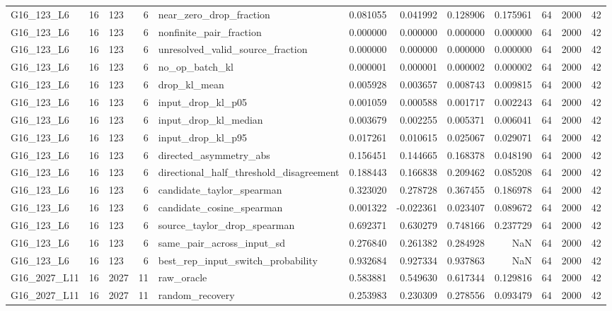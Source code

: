 \begin{tabular}{lrlrlrrrrrrr}
G16_123_L6 & 16 & 123 & 6 & near_zero_drop_fraction & 0.081055 & 0.041992 & 0.128906 & 0.175961 & 64 & 2000 & 42 \\
G16_123_L6 & 16 & 123 & 6 & nonfinite_pair_fraction & 0.000000 & 0.000000 & 0.000000 & 0.000000 & 64 & 2000 & 42 \\
G16_123_L6 & 16 & 123 & 6 & unresolved_valid_source_fraction & 0.000000 & 0.000000 & 0.000000 & 0.000000 & 64 & 2000 & 42 \\
G16_123_L6 & 16 & 123 & 6 & no_op_batch_kl & 0.000001 & 0.000001 & 0.000002 & 0.000002 & 64 & 2000 & 42 \\
G16_123_L6 & 16 & 123 & 6 & drop_kl_mean & 0.005928 & 0.003657 & 0.008743 & 0.009815 & 64 & 2000 & 42 \\
G16_123_L6 & 16 & 123 & 6 & input_drop_kl_p05 & 0.001059 & 0.000588 & 0.001717 & 0.002243 & 64 & 2000 & 42 \\
G16_123_L6 & 16 & 123 & 6 & input_drop_kl_median & 0.003679 & 0.002255 & 0.005371 & 0.006041 & 64 & 2000 & 42 \\
G16_123_L6 & 16 & 123 & 6 & input_drop_kl_p95 & 0.017261 & 0.010615 & 0.025067 & 0.029071 & 64 & 2000 & 42 \\
G16_123_L6 & 16 & 123 & 6 & directed_asymmetry_abs & 0.156451 & 0.144665 & 0.168378 & 0.048190 & 64 & 2000 & 42 \\
G16_123_L6 & 16 & 123 & 6 & directional_half_threshold_disagreement & 0.188443 & 0.166838 & 0.209462 & 0.085208 & 64 & 2000 & 42 \\
G16_123_L6 & 16 & 123 & 6 & candidate_taylor_spearman & 0.323020 & 0.278728 & 0.367455 & 0.186978 & 64 & 2000 & 42 \\
G16_123_L6 & 16 & 123 & 6 & candidate_cosine_spearman & 0.001322 & -0.022361 & 0.023407 & 0.089672 & 64 & 2000 & 42 \\
G16_123_L6 & 16 & 123 & 6 & source_taylor_drop_spearman & 0.692371 & 0.630279 & 0.748166 & 0.237729 & 64 & 2000 & 42 \\
G16_123_L6 & 16 & 123 & 6 & same_pair_across_input_sd & 0.276840 & 0.261382 & 0.284928 & NaN & 64 & 2000 & 42 \\
G16_123_L6 & 16 & 123 & 6 & best_rep_input_switch_probability & 0.932684 & 0.927334 & 0.937863 & NaN & 64 & 2000 & 42 \\
G16_2027_L11 & 16 & 2027 & 11 & raw_oracle & 0.583881 & 0.549630 & 0.617344 & 0.129816 & 64 & 2000 & 42 \\
G16_2027_L11 & 16 & 2027 & 11 & random_recovery & 0.253983 & 0.230309 & 0.278556 & 0.093479 & 64 & 2000 & 42 \\

\end{tabular}
